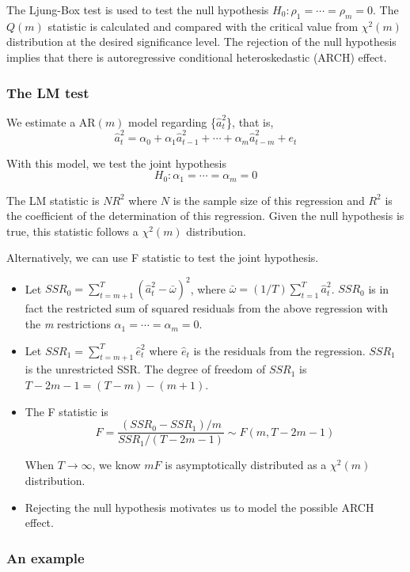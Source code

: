 \documentclass[a4paper,11pt]{article}
\begin{document}
The Ljung-Box test is used to test the null hypothesis
\(H_0: \rho_1 = \cdots = \rho_m = 0\). The \(Q(m)\) statistic is
calculated and compared with the critical value from \(\chi^2(m)\)
distribution at the desired significance level. The rejection of the
null hypothesis implies that there is autoregressive conditional
heteroskedastic (ARCH) effect.

\subsubsection{The LM test}
\label{sec:org14ab4b0}

We estimate a AR\((m)\) model regarding \{\(\hat{a}^2_t\)\}, that is,
\[ \hat{a}^2_t = \alpha_0 + \alpha_1 \hat{a}_{t-1}^2 + \cdots +
\alpha_m \hat{a}^2_{t-m} + e_t \]

With this model, we test the joint hypothesis
\[H_0: \alpha_1 = \cdots = \alpha_m = 0 \]

The LM statistic is \(NR^2\) where \(N\) is the sample size of this
regression and \(R^2\) is the coefficient of the determination of this
regression. Given the null hypothesis is true, this statistic follows
a \(\chi^2(m)\) distribution.

Alternatively, we can use F statistic to test the joint
hypothesis.
\begin{itemize}
\item Let \(SSR_0 = \sum_{t=m+1}^{T} (\hat{a}^2_{t} -
  \bar{\omega})^2\), where \(\bar{\omega} = (1/T) \sum_{t=1}^T
  \hat{a}^2_t\). \(SSR_0\) is in fact the restricted sum of squared
residuals from the above regression with the \emph{m} restrictions
\(\alpha_1 = \cdots = \alpha_m = 0\).
\item Let \(SSR_1 = \sum_{t=m+1}^T \hat{e}^2_t\) where \(\hat{e}_t\) is the
residuals from the regression. \(SSR_1\) is the unrestricted SSR. The
degree of freedom of \(SSR_1\) is \(T-2m-1 = (T-m) - (m+1)\).
\item The F statistic is
\[F = \frac{(SSR_0 - SSR_1)/m}{SSR_1/(T-2m-1)} \sim F(m, T-2m-1)\]

When \(T \rightarrow \infty\), we know \(mF\) is asymptotically
distributed as a \(\chi^2(m)\) distribution.

\item Rejecting the null hypothesis motivates us to model the possible
ARCH effect.
\end{itemize}

\subsubsection{An example}
\label{sec:orge69d2c3}
\end{document}

